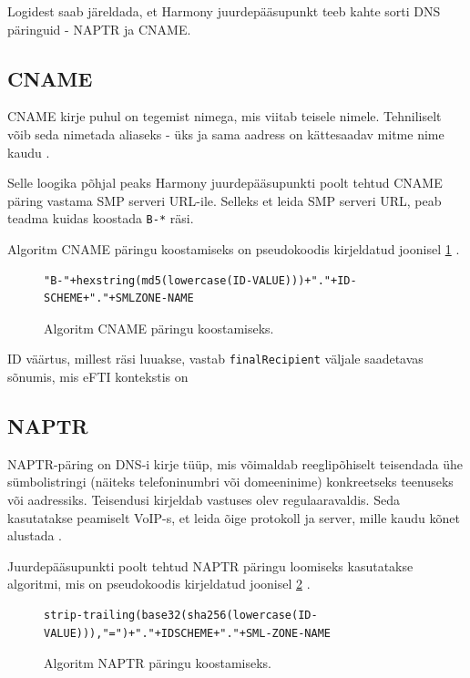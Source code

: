 Logidest saab järeldada, et Harmony juurdepääsupunkt teeb kahte sorti DNS päringuid - NAPTR ja CNAME.


\subsection{CNAME}\label{cname}
CNAME kirje puhul on tegemist nimega, mis viitab teisele nimele. 
Tehniliselt võib seda nimetada aliaseks - üks ja sama aadress on kättesaadav mitme nime kaudu \cite{zone_cname_help}.

Selle loogika põhjal peaks Harmony juurdepääsupunkti poolt tehtud 
 CNAME päring vastama SMP serveri URL-ile.
Selleks et leida SMP serveri URL, peab teadma kuidas koostada \texttt{B-*} räsi. 

Algoritm CNAME päringu koostamiseks on pseudokoodis kirjeldatud joonisel \ref{cname-algoritm} \cite[Peatükk 2.1.2]{peppol_cname_naptr_2025}.

\begin{figure}[H]
  \centering
\begin{lstlisting}[frame=single, basicstyle=\small, breaklines=true]
"B-"+hexstring(md5(lowercase(ID-VALUE)))+"."+ID-SCHEME+"."+SMLZONE-NAME
\end{lstlisting}
  \caption{Algoritm CNAME päringu koostamiseks.}
  \label{cname-algoritm}
\end{figure}

ID väärtus, millest räsi luuakse, vastab \texttt{finalRecipient} väljale saadetavas sõnumis,
mis eFTI kontekstis on  


\subsection{NAPTR}\label{naptr}
NAPTR-päring on DNS-i kirje tüüp, mis võimaldab reeglipõhiselt teisendada ühe sümbolistringi 
(näiteks telefoninumbri või domeeninime) konkreetseks teenuseks või aadressiks.
Teisendusi kirjeldab vastuses olev regulaaravaldis. 
Seda kasutatakse peamiselt VoIP-s, et leida õige protokoll ja server, 
mille kaudu kõnet alustada \cite[Sektsioon 1]{rfc3403}.

Juurdepääsupunkti poolt tehtud NAPTR päringu loomiseks kasutatakse 
algoritmi, mis on pseudokoodis kirjeldatud joonisel \ref{naptr-algorithm} \cite[Peatükk 2.1.2]{peppol_cname_naptr_2025}.

\begin{figure}[H]
  \centering
\begin{lstlisting}[frame=single, basicstyle=\small, breaklines=true]
strip-trailing(base32(sha256(lowercase(ID-VALUE))),"=")+"."+IDSCHEME+"."+SML-ZONE-NAME
\end{lstlisting}
  \caption{Algoritm NAPTR päringu koostamiseks.}
  \label{naptr-algorithm}
\end{figure}


